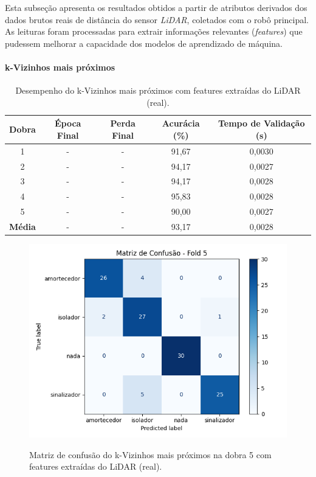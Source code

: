 Esta subseção apresenta os resultados obtidos a partir de atributos derivados dos dados brutos reais de distância do sensor \textit{LiDAR}, coletados com o robô principal. As leituras foram processadas para extrair informações relevantes (\textit{features}) que pudessem melhorar a capacidade dos modelos de aprendizado de máquina.

\paragraph{k-Vizinhos mais próximos}

\begin{table}[H]
\caption{Desempenho do k-Vizinhos mais próximos com features extraídas do LiDAR (real).}
\centering
\begin{tabular}{ccccc}
\hline
\textbf{Dobra} & \textbf{Época Final} & \textbf{Perda Final} & \textbf{Acurácia (\%)} & \textbf{Tempo de Validação (s)}  \\
\hline
1 & - & - & 91,67 & 0,0030 \\
2 & - & - & 94,17 & 0,0027 \\
3 & - & - & 94,17 & 0,0028 \\
4 & - & - & 95,83 & 0,0028 \\
5 & - & - & 90,00 & 0,0027 \\
\hline
\textbf{Média} & - & - & 93,17 & 0,0028 \\
\hline
\end{tabular}
\fonte{}
\label{tab:knn_features_imagens_real}
\end{table}

\begin{figure}[H]
\caption{Matriz de confusão do k-Vizinhos mais próximos na dobra 5 com features extraídas do LiDAR (real).}
\centering
\includegraphics[width=0.7\linewidth]{figuras/Resultados/real_principal_Teste4_knn.png}
\fonte{}
\label{fig:matriz_confusao_knn_imagens_real_dobra5}
\end{figure}

